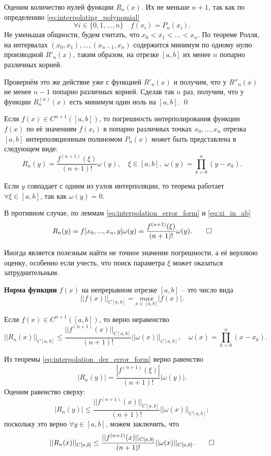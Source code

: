 \documentclass[../main.tex]{subfile}
\begin{document}
	Оценим количество нулей функции $R_n(x)$. Их не меньше $n+1$, так как
	по определению \eqref{eq:interpolating_polynomial}
	\[\forall i\in \{0,1,...,n\}\quad f(x_i)=P_n(x_i).\]
	Не уменьшая общности, будем считать, что $x_0<x_1<...<x_n$.
	По теореме Ролля, на интервалах $(x_0,x_1),...,(x_{n-1},x_n)$ содержится
	минимум по одному нулю производной $R'_n(x)$, таким образом, на отрезке
	$[a,b]$ их менее $n$ попарно различных корней.

	Провернём это же действие уже с функцией $R'_n(x)$ и получим, что у
	$R''_n(x)$ не менее $n-1$ попарно различных корней. Сделав так $n$ раз,
	получим, что у функции $R_n^{(n)}(x)$ есть минимум один ноль на $[a,b]$.
	\qed

\begin{theorem}\label{eq:interpolation_der_error_form}
	Если $f(x)\in C^{n+1}([a,b])$, то погрешность интерполирования функции
	$f(x)$ по её значениям $f(x_i)$ в попарно различных точках $x_0,...,x_n$
	отрезка $[a,b]$ интерполяционным полиномом $P_n(x)$ может быть
	представлена в следующем виде:
	\[\boxed{R_n(y)=\frac{f^{(n+1)}(\xi)}{(n+1)!}\omega(y)},\quad\xi\in
	[a,b],\;\omega(y)=\prod_{k=0}^{n}(y-x_k).\]
\end{theorem}

\beginproof

	Если $y$ совпадает с одним из узлов интерполяции, то теорема работает
	$\forall\xi\in[a,b]$, так как $\omega(y)=0$.

	В противном случае, по леммам \eqref{eq:interpolation_error_form} и
	\eqref{eq:xi_in_ab}
	\[R_n(y)=f[x_0,...,x_n,y]\omega(y)=\frac{f^{(n+1)}(\xi)}{(n+1)!}
	\omega(y).\qed\]

Иногда является полезным найти не точное значение погрешности, а её верхнюю
оценку, особенно если учесть, что поиск параметра $\xi$ может оказаться
затруднительным.

\begin{define}\label{eq:function_norm}
	\textbf{Норма функции} $f(x)$ на непрерывном отрезке $[a,b]$ -- это
	число вида
	\[||f(x)||_{C[a,b]}=\underset{x\in[a,b]}{max}|f(x)|.\]
\end{define}

\begin{corollary}
	Если $f(x)\in C^{n+1}([a,b])$, то верно неравенство
	\[||R_n(x)||_{C[a,b]}\le \frac{||f^{(n+1)}(x)||_{C[a,b]}}{(n+1)!}
	||\omega(x)||_{C[a,b]},\quad \omega(x)=\prod_{k=0}^{n}(x-x_k).\]
\end{corollary}

\beginproof
	Из теоремы \eqref{eq:interpolation_der_error_form} верно равенство
	\[|R_n(y)|=\frac{|f^{(n+1)}(\xi)|}{(n+1)!}|\omega(y)|.\]
	Оценим равенство сверху:
	\[|R_n(y)|\le\frac{||f^{(n+1)}(x)||_{C[a,b]}}{(n+1)!}||\omega(x)||_
	{C[a,b]};\]
	поскольку это верно $\forall y\in[a,b]$, можем заключить, что
	\[||R_n(x)||_{C[a,b]}\le \frac{||f^{(n+1)}(x)||_{C[a,b]}}{(n+1)!}
	||\omega(x)||_{C[a,b]}.\qed\]
\end{document}
